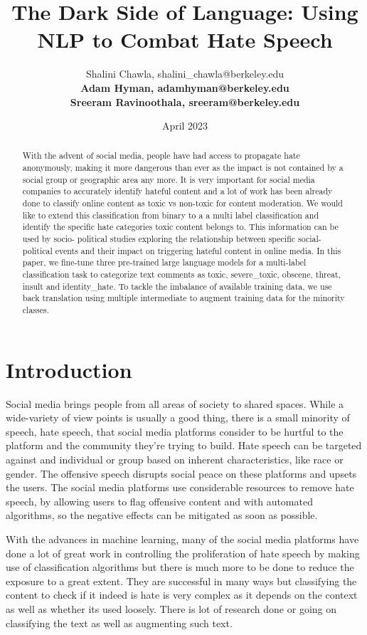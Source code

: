\documentclass[11pt,a4paper]{article}
\title{The Dark Side of Language: Using NLP to Combat Hate Speech}
\author{ 
  Shalini Chawla, shalini\_chawla@berkeley.edu
  \\[2ex]
  \textbf{Adam Hyman, adamhyman@berkeley.edu}
  \\[2ex]
  \textbf{Sreeram Ravinoothala, sreeram@berkeley.edu} 
  }
\date{April 2023}
\begin{document}
\maketitle
\begin{abstract}
With the advent of social media, people have had access to propagate hate anonymously, making it more dangerous than ever as the impact is not contained by a social group or geographic area any more. It is very important for social media companies to accurately identify hateful content and a lot of work has been already done to classify online content as toxic vs non-toxic for content moderation. We would like to extend this classification from binary to a a multi label classification and identify the specific hate categories toxic content belongs to. This information can be used by socio- political studies exploring the relationship between specific social-political events and their impact on triggering hateful content in online media. In this paper, we fine-tune three pre-trained large language models for a multi-label classification task to categorize text comments as toxic, severe\_toxic, obscene, threat, insult and identity\_hate. To tackle the imbalance of available training data, we use back translation using multiple intermediate to augment training data for the minority classes.

\end{abstract}

\section{Introduction}

Social media brings people from all areas of society to shared spaces.  While a wide-variety of view points is usually a good thing, there is a small minority of speech, hate speech, that social media platforms consider to be hurtful to the platform and the community they're trying to build.  Hate speech can be targeted against and individual or group based on inherent characteristics, like race or gender.  The offensive speech disrupts social peace on these platforms and upsets the users.  The social media platforms use considerable resources to remove hate speech, by allowing users to flag offensive content and with automated algorithms, so the negative effects can be mitigated as soon as possible.

With the advances in machine learning, many of the social media platforms have done a lot of great work in controlling the proliferation of hate speech by making use of classification algorithms but there is much more to be done to reduce the exposure to a great extent. They are successful in many ways but classifying the content to check if it indeed is hate is very complex as it depends on the context as well as whether its used loosely. There is lot of research done or going on classifying the text as well as augmenting such text.
\end{document}
